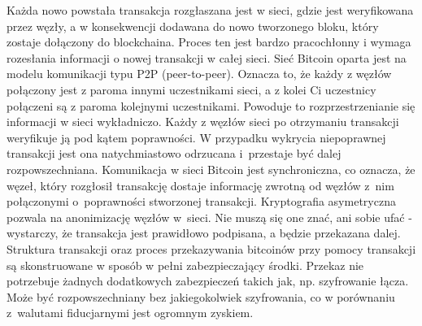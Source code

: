 \documentclass[12pt, twoside, final, openany]{mgr}
\begin{document}
\indent Każda nowo powstała transakcja rozgłaszana jest w sieci, gdzie jest weryfikowana przez węzły, a w konsekwencji dodawana do nowo tworzonego bloku, który zostaje dołączony do blockchaina. Proces ten jest bardzo pracochłonny i wymaga rozesłania informacji o nowej transakcji w całej sieci. Sieć Bitcoin oparta jest na modelu komunikacji typu P2P (peer-to-peer). Oznacza to, że każdy z węzłów połączony jest z paroma innymi uczestnikami sieci, a z kolei Ci uczestnicy połączeni są z paroma kolejnymi uczestnikami. Powoduje to rozprzestrzenianie się informacji w sieci wykładniczo. Każdy z węzłów sieci po otrzymaniu transakcji weryfikuje ją pod kątem poprawności. W przypadku wykrycia niepoprawnej transakcji jest ona natychmiastowo odrzucana i~przestaje być dalej rozpowszechniana. Komunikacja w sieci Bitcoin jest synchroniczna, co oznacza, że węzeł, który rozgłosił transakcję dostaje informację zwrotną od węzłów z~nim połączonymi o~poprawności stworzonej transakcji. Kryptografia asymetryczna pozwala na anonimizację węzłów w~sieci. Nie muszą się one znać, ani sobie ufać - wystarczy, że transakcja jest prawidłowo podpisana, a będzie przekazana dalej. Struktura transakcji oraz proces przekazywania bitcoinów przy pomocy transakcji są skonstruowane w sposób w pełni zabezpieczający środki. Przekaz nie potrzebuje żadnych dodatkowych zabezpieczeń takich jak, np. szyfrowanie łącza. Może być rozpowszechniany bez jakiegokolwiek szyfrowania, co w porównaniu z~walutami fiducjarnymi jest ogromnym zyskiem\cite{Mastering}.
\end{document}
